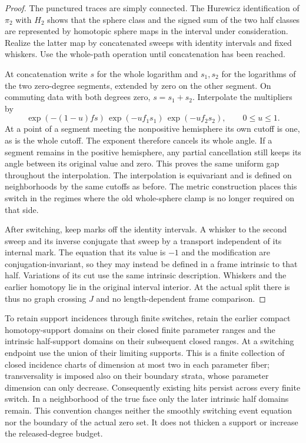 \begin{proof}
The punctured traces are simply connected.  The Hurewicz identification
of $\pi_2$ with $H_2$ shows that the sphere class and the signed sum of
the two half classes are represented by homotopic sphere maps in the
interval under consideration.  Realize the latter map by concatenated
sweeps with identity intervals and fixed whiskers.  Use the whole-path
operation until concatenation has been reached.

At concatenation write $s$ for the whole logarithm and $s_1,s_2$ for
the logarithms of the two zero-degree segments, extended by zero on
the other segment.  On commuting data with both degrees zero,
$s=s_1+s_2$.  Interpolate the multipliers by
\[
 \exp(-(1-u)f s)\,
 \exp(-u f_1s_1)\,\exp(-u f_2s_2),\qquad 0\leq u\leq1.
\]
At a point of a segment meeting the nonpositive hemisphere its own cutoff
is one, as is the whole cutoff.  The exponent therefore cancels its
whole angle.  If a segment remains in the positive hemisphere, any
partial cancellation still keeps its angle between its original value
and zero.  This proves the same uniform gap throughout the interpolation.
The interpolation is equivariant and is defined on neighborhoods by the
same cutoffs as before.  The metric construction places this switch in
the regimes where the old whole-sphere clamp is no longer required on
that side.

After switching, keep marks off the identity intervals.  A whisker to
the second sweep and its inverse conjugate that sweep by a transport
independent of its internal mark.  The equation that its value is $-1$
and the modification are conjugation-invariant, so they may instead be
defined in a frame intrinsic to that half.  Variations of its cut use
the same intrinsic description.  Whiskers and the earlier homotopy lie
in the original interval interior.  At the actual split there is thus
no graph crossing $J$ and no length-dependent frame comparison.
\end{proof}

To retain support incidences through finite switches, retain the earlier compact
homotopy-support domains on their closed finite parameter ranges and
the intrinsic half-support domains on their subsequent closed ranges.
At a switching endpoint use the union of their limiting supports.
This is a finite collection of closed incidence charts of dimension
at most two in each parameter fiber; transversality is imposed also
on their boundary strata, whose parameter dimension can only decrease.
Consequently existing hits persist across every finite switch.
In a neighborhood of the true face only the later intrinsic half
domains remain.  This convention changes neither the smoothly
switching event equation nor the boundary of the actual zero set.
It does not thicken a support or increase the released-degree budget.


